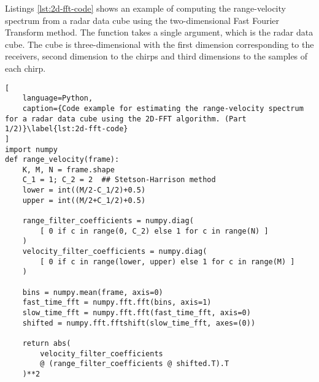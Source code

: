 Listings \ref{lst:2d-fft-code} shows an example of computing the range-velocity spectrum from a radar data cube using the two-dimensional Fast Fourier Transform method.
The function takes a single argument, which is the radar data cube.
The cube is three-dimensional with the first dimension corresponding to the receivers,
second dimension to the chirps and third dimensions to the samples of each chirp.

\begin{lstlisting}[
    language=Python,
    caption={Code example for estimating the range-velocity spectrum for a radar data cube using the 2D-FFT algorithm. (Part 1/2)}\label{lst:2d-fft-code}
]
import numpy
def range_velocity(frame):
    K, M, N = frame.shape
    C_1 = 1; C_2 = 2  ## Stetson-Harrison method
    lower = int((M/2-C_1/2)+0.5)
    upper = int((M/2+C_1/2)+0.5)

    range_filter_coefficients = numpy.diag(
        [ 0 if c in range(0, C_2) else 1 for c in range(N) ]
    )
    velocity_filter_coefficients = numpy.diag(
        [ 0 if c in range(lower, upper) else 1 for c in range(M) ]
    )

    bins = numpy.mean(frame, axis=0)
    fast_time_fft = numpy.fft.fft(bins, axis=1)
    slow_time_fft = numpy.fft.fft(fast_time_fft, axis=0)
    shifted = numpy.fft.fftshift(slow_time_fft, axes=(0))
    
    return abs(
        velocity_filter_coefficients 
        @ (range_filter_coefficients @ shifted.T).T
    )**2
\end{lstlisting}